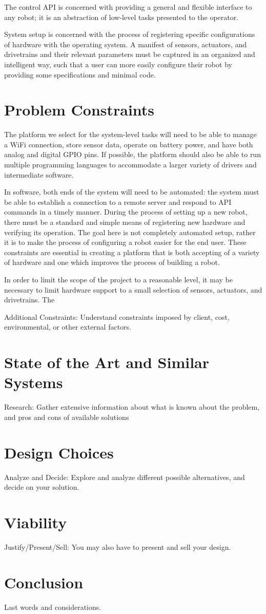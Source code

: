 \documentclass{article}
\begin{document}
The control API is concerned with providing a general and flexible interface to any robot;  it is an abstraction of low-level tasks presented to the operator.

System setup is concerned with the process of registering specific configurations of hardware with the operating system.  A manifest of sensors, actuators, and drivetrains and their relevant parameters must be captured in an organized and intelligent way, such that a user can more easily configure their robot by providing some specifications and minimal code.

\section{Problem Constraints}
The platform we select for the system-level tasks will need to be able to manage a WiFi connection, store sensor data, operate on battery power, and have both analog and digital GPIO pins.  If possible, the platform should also be able to run multiple programming languages to accommodate a larger variety of drivers and intermediate software.

In software, both ends of the system will need to be automated: the system must be able to establish a connection to a remote server and respond to API commands in a timely manner.  During the process of setting up a new robot, there must be a standard and simple means of registering new hardware and verifying its operation.  The goal here is not completely automated setup, rather it is to make the process of configuring a robot easier for the end user.  These constraints are essential in creating a platform that is both accepting of a variety of hardware and one which improves the process of building a robot.

In order to limit the scope of the project to a reasonable level, it may be necessary to limit hardware support to a small selection of sensors, actuators, and drivetrains.  The

Additional Constraints:
Understand constraints imposed by client,
cost, environmental, or other external factors.

\section{State of the Art and Similar Systems}
Research:
Gather extensive information about what is known about
the problem, and pros and cons of available solutions

\section{Design Choices}
Analyze and Decide:
Explore and analyze different possible
alternatives, and decide on your solution.

\section{Viability}
Justify/Present/Sell:
You may also have to present and sell your
design.

\section{Conclusion}
Last words and considerations.
\end{document}
